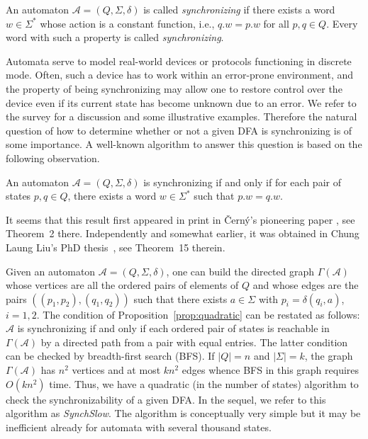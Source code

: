 \documentclass{jalc}
\begin{document}
An automaton $\mathcal{A}=(Q, \Sigma, \delta)$ is called \emph{synchronizing} if there exists a word $w \in \Sigma^*$ whose action is a constant function, i.e., $q.w = p.w$ for all $p,q \in Q$. Every word with such a property is called \emph{synchronizing}.

Automata serve to model real-world devices or protocols functioning in discrete mode. Often, such a device has to work within an error-prone environment, and the property of being synchronizing may allow one to restore control over the device even if its current state has become unknown due to an error. We refer to the survey \cite{Volkov:2008} for a discussion and some illustrative examples. Therefore the natural question of how to determine whether or not a given DFA is synchronizing is of some importance. A well-known algorithm to answer this question is based on the following observation.
\begin{proposition}
\label{prop:quadratic}
An automaton $\mathcal{A}=(Q, \Sigma, \delta)$ is synchronizing if and only if for each pair of states $p,q \in Q$, there exists a word $w\in\Sigma^*$ such that $p.w = q.w$.
\end{proposition}

It seems that this result first appeared in print in \v{C}ern\'y's pioneering paper \cite{Cerny:1964}, see Theorem~2 there. Independently and somewhat earlier, it was obtained in Chung Laung Liu's PhD thesis~\cite{Liu:1963}, see Theorem~15 therein.

Given an automaton $\mathcal{A}=(Q, \Sigma, \delta)$, one can build the directed graph $\Gamma(\mathcal{A})$ whose vertices are all the ordered pairs of elements of $Q$ and whose edges are the pairs $((p_1,p_2),(q_1,q_2))$ such that there exists $a\in\Sigma$ with $p_i=\delta(q_i,a)$, $i=1,2$. The condition of Proposition~\ref{prop:quadratic} can be restated as follows: $\mathcal{A}$ is synchronizing if and only if each ordered pair of states is reachable in $\Gamma(\mathcal{A})$ by a directed path from a pair with equal entries. The latter condition can be checked by breadth-first search (BFS). If $|Q|=n$ and $|\Sigma|=k$, the graph $\Gamma(\mathcal{A})$ has $n^2$ vertices and at most $kn^2$ edges whence BFS in this graph requires $O(kn^2)$ time. Thus, we have a quadratic (in the number of states) algorithm to check the synchronizability of a given DFA. In the sequel, we refer to this algorithm as \emph{SynchSlow}. The algorithm is conceptually very simple but it may be inefficient already for automata with several thousand states.
\end{document}
